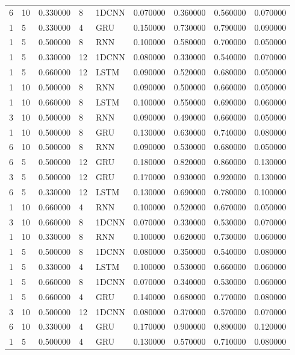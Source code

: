 \begin{tabular}{llrllrrrr}
6 & 10 & 0.330000 & 8 & 1DCNN & 0.070000 & 0.360000 & 0.560000 & 0.070000 \\
1 & 5 & 0.330000 & 4 & GRU & 0.150000 & 0.730000 & 0.790000 & 0.090000 \\
1 & 5 & 0.500000 & 8 & RNN & 0.100000 & 0.580000 & 0.700000 & 0.050000 \\
1 & 5 & 0.330000 & 12 & 1DCNN & 0.080000 & 0.330000 & 0.540000 & 0.070000 \\
1 & 5 & 0.660000 & 12 & LSTM & 0.090000 & 0.520000 & 0.680000 & 0.050000 \\
1 & 10 & 0.500000 & 8 & RNN & 0.090000 & 0.500000 & 0.660000 & 0.050000 \\
1 & 10 & 0.660000 & 8 & LSTM & 0.100000 & 0.550000 & 0.690000 & 0.060000 \\
3 & 10 & 0.500000 & 8 & RNN & 0.090000 & 0.490000 & 0.660000 & 0.050000 \\
1 & 10 & 0.500000 & 8 & GRU & 0.130000 & 0.630000 & 0.740000 & 0.080000 \\
6 & 10 & 0.500000 & 8 & RNN & 0.090000 & 0.530000 & 0.680000 & 0.050000 \\
6 & 5 & 0.500000 & 12 & GRU & 0.180000 & 0.820000 & 0.860000 & 0.130000 \\
3 & 5 & 0.500000 & 12 & GRU & 0.170000 & 0.930000 & 0.920000 & 0.130000 \\
6 & 5 & 0.330000 & 12 & LSTM & 0.130000 & 0.690000 & 0.780000 & 0.100000 \\
1 & 10 & 0.660000 & 4 & RNN & 0.100000 & 0.520000 & 0.670000 & 0.050000 \\
3 & 10 & 0.660000 & 8 & 1DCNN & 0.070000 & 0.330000 & 0.530000 & 0.070000 \\
1 & 10 & 0.330000 & 8 & RNN & 0.100000 & 0.620000 & 0.730000 & 0.060000 \\
1 & 5 & 0.500000 & 8 & 1DCNN & 0.080000 & 0.350000 & 0.540000 & 0.080000 \\
1 & 5 & 0.330000 & 4 & LSTM & 0.100000 & 0.530000 & 0.660000 & 0.060000 \\
1 & 5 & 0.660000 & 8 & 1DCNN & 0.070000 & 0.340000 & 0.530000 & 0.060000 \\
1 & 5 & 0.660000 & 4 & GRU & 0.140000 & 0.680000 & 0.770000 & 0.080000 \\
3 & 10 & 0.500000 & 12 & 1DCNN & 0.080000 & 0.370000 & 0.570000 & 0.070000 \\
6 & 10 & 0.330000 & 4 & GRU & 0.170000 & 0.900000 & 0.890000 & 0.120000 \\
1 & 5 & 0.500000 & 4 & GRU & 0.130000 & 0.570000 & 0.710000 & 0.080000 \\

\end{tabular}
